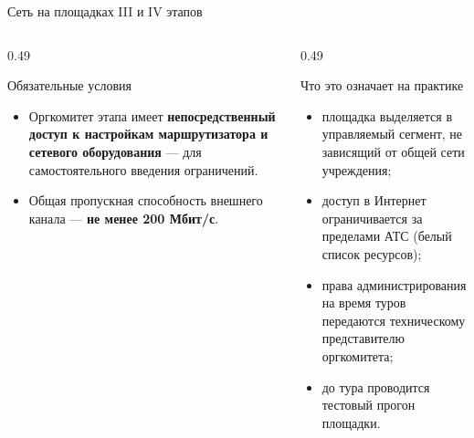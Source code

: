 \begin{frame}{Сеть на площадках III и IV этапов\orient}
  \vspace{0.3em}
  \begin{columns}[T]
    \begin{column}{0.49\textwidth}
      \begin{block}{Обязательные условия}
        \begin{itemize}\setlength\itemsep{0.3em}
          \item Оргкомитет этапа имеет \textbf{непосредственный доступ
                к настройкам маршрутизатора и сетевого оборудования} ---
                для самостоятельного введения ограничений.
          \item Общая пропускная способность внешнего канала ---
                \textbf{не менее 200 Мбит/с}.
        \end{itemize}
      \end{block}
    \end{column}
    \begin{column}{0.49\textwidth}
      \begin{block}{Что это означает на практике}
        \begin{itemize}\setlength\itemsep{0.3em}
          \item площадка выделяется в управляемый сегмент, не зависящий
                от общей сети учреждения;
          \item доступ в Интернет ограничивается за пределами АТС
                (белый список ресурсов);
          \item права администрирования на время туров передаются
                техническому представителю оргкомитета;
          \item до тура проводится тестовый прогон площадки.
        \end{itemize}
      \end{block}
    \end{column}
  \end{columns}
\end{frame}
